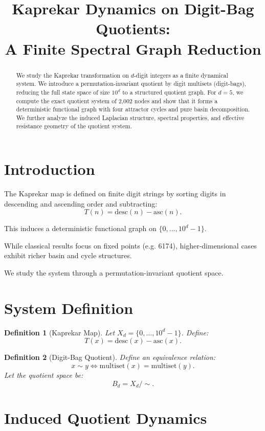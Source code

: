 \documentclass[11pt]{article}
\title{Kaprekar Dynamics on Digit-Bag Quotients:\\A Finite Spectral Graph Reduction}
\author{}
\date{}
\newtheorem{definition}{Definition}
\begin{document}
\maketitle

\begin{abstract}
We study the Kaprekar transformation on $d$-digit integers as a finite dynamical system. 
We introduce a permutation-invariant quotient by digit multisets (digit-bags), reducing the full state space of size $10^d$ to a structured quotient graph. 
For $d=5$, we compute the exact quotient system of 2,002 nodes and show that it forms a deterministic functional graph with four attractor cycles and pure basin decomposition. 
We further analyze the induced Laplacian structure, spectral properties, and effective resistance geometry of the quotient system.
\end{abstract}

\section{Introduction}

The Kaprekar map is defined on finite digit strings by sorting digits in descending and ascending order and subtracting:
\[
T(n) = \text{desc}(n) - \text{asc}(n).
\]

This induces a deterministic functional graph on $\{0,\dots,10^d-1\}$.

While classical results focus on fixed points (e.g. 6174), higher-dimensional cases exhibit richer basin and cycle structures.

We study the system through a permutation-invariant quotient space.

\section{System Definition}

\begin{definition}[Kaprekar Map]
Let $X_d = \{0,\dots,10^d-1\}$. Define:
\[
T(x) = \text{desc}(x) - \text{asc}(x).
\]
\end{definition}

\begin{definition}[Digit-Bag Quotient]
Define an equivalence relation:
\[
x \sim y \iff \text{multiset}(x) = \text{multiset}(y).
\]
Let the quotient space be:
\[
B_d = X_d / \sim.
\]
\end{definition}

\section{Induced Quotient Dynamics}
\end{document}
